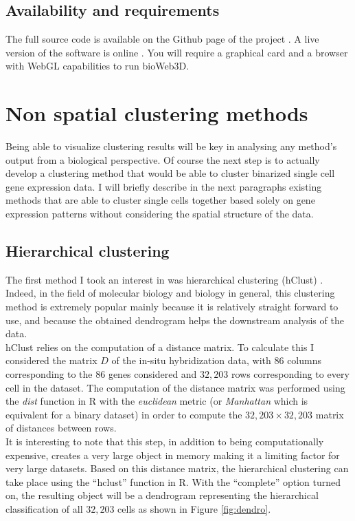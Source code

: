	\subsection{Availability and requirements}
The full source code is available on the Github page of the project \cite{github}. A live version of the software is online \cite{bioWeb3D}. You will require a graphical card and a browser with WebGL capabilities to run bioWeb3D.

\section{Non spatial clustering methods}
Being able to visualize clustering results will be key in analysing any method's output from a biological perspective. Of course the next step is to actually develop a clustering method that would be able to cluster binarized single cell gene expression data. I will briefly describe in the next paragraphs existing methods that are able to cluster single cells together based solely on gene expression patterns without considering the spatial structure of the data.
	\subsection{Hierarchical clustering}
	The first method I took an interest in was hierarchical clustering (hClust) \cite{johnson67}. Indeed, in the field of molecular biology and biology in general, this clustering method is extremely popular mainly because it is relatively straight forward to use, and because the obtained dendrogram helps the downstream analysis of the data.\\
	
	hClust relies on the computation of a distance matrix. To calculate this I considered the matrix $D$ of the in-situ hybridization data, with $86$ columns corresponding to the 86 genes considered and $32,203$ rows corresponding to every cell in the dataset. The computation of the distance matrix was performed using the \emph{dist} function in R with the \emph{euclidean} metric (or \emph{Manhattan} which is equivalent for a binary dataset) in order to compute the $32,203 \times 32,203$ matrix of distances between rows.\\
	
	It is interesting to note that this step, in addition to being computationally expensive, creates a very large object in memory making it a limiting factor for very large datasets. Based on this distance matrix, the hierarchical clustering can take place using the ``hclust'' function in R. With the ``complete'' option turned on, the resulting object will be a dendrogram  representing the hierarchical classification of all $32,203$ cells as shown in Figure \ref{fig:dendro}.\\
	
